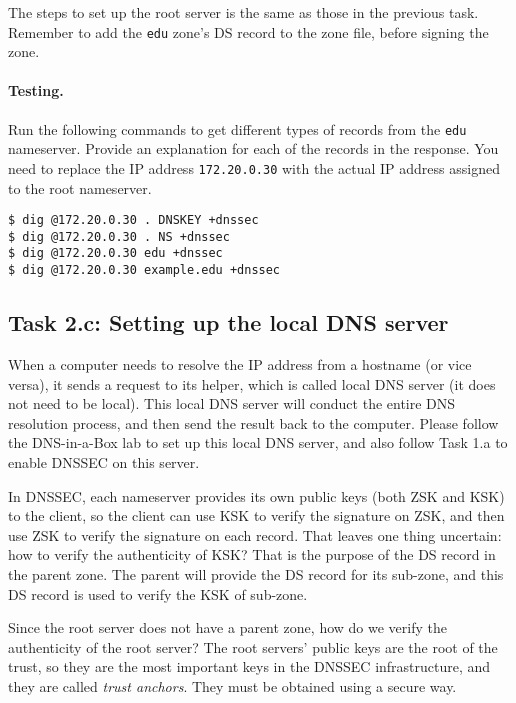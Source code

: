 The steps to set up the root server is the same as those in the 
previous task. Remember to add the \texttt{edu} zone's DS record 
to the zone file, before signing the zone.  


\paragraph{Testing.}
Run the following commands to get different types of records
from the \texttt{edu} nameserver. Provide an explanation
for each of the records in the response. You need to
replace the IP address \texttt{172.20.0.30} with the actual
IP address assigned to the root nameserver.


\begin{lstlisting}
$ dig @172.20.0.30 . DNSKEY +dnssec
$ dig @172.20.0.30 . NS +dnssec
$ dig @172.20.0.30 edu +dnssec
$ dig @172.20.0.30 example.edu +dnssec
\end{lstlisting}



\subsection{Task 2.c: Setting up the local DNS server} 


When a computer needs to resolve the IP address from a hostname (or vice versa),
it sends a request to its helper, which is called local DNS server (it
does not need to be local).  This local DNS server will conduct the
entire DNS resolution process, and then send the result back to the computer.
Please follow the DNS-in-a-Box lab to set up this local DNS server, and also
follow Task 1.a to enable DNSSEC on this server. 

In DNSSEC, each nameserver provides its own public keys (both ZSK and KSK) to
the client, so the client can use KSK to verify the signature on ZSK, and then use ZSK to 
verify the signature on each record. That leaves one thing uncertain: how to verify
the authenticity of KSK? That is the purpose of the DS record in the parent zone. 
The parent will provide the DS record for its sub-zone, and this DS record is used 
to verify the KSK of sub-zone. 

Since the root server does not have a parent zone, how do we verify the authenticity 
of the root server?  The root servers' public keys are the root of the trust, so they are 
the most important keys in the DNSSEC infrastructure, and they are called \textit{trust
anchors}. They must be obtained using a secure way. 

